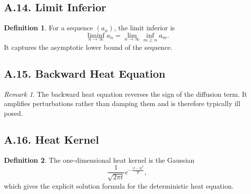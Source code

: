 \documentclass[11pt]{article}
\theoremstyle{definition}
\newtheorem{definition}{Definition}
\theoremstyle{remark}
\newtheorem{remark}{Remark}
\begin{document}
\subsection*{A.14. Limit Inferior}
\begin{definition}
For a sequence \((a_n)\), the limit inferior is
\[
\liminf_{n\to\infty} a_n
=
\lim_{n\to\infty}\inf_{m\ge n} a_m.
\]
It captures the asymptotic lower bound of the sequence.
\end{definition}

\subsection*{A.15. Backward Heat Equation}
\begin{remark}
The backward heat equation reverses the sign of the diffusion term. It amplifies perturbations rather than damping them and is therefore typically ill posed.
\end{remark}

\subsection*{A.16. Heat Kernel}
\begin{definition}
The one-dimensional heat kernel is the Gaussian
\[
\frac{1}{\sqrt{2\pi t}}e^{-\frac{|x-y|^2}{2t}},
\]
which gives the explicit solution formula for the deterministic heat equation.
\end{definition}
\end{document}
